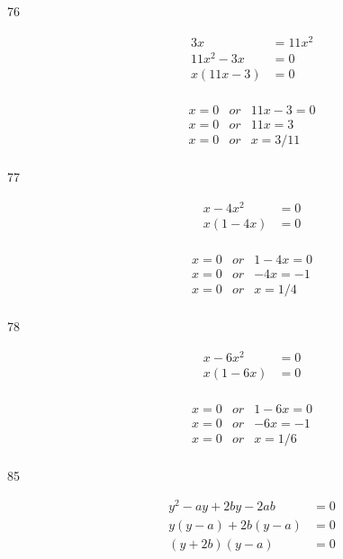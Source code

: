 \documentclass[letterpaper]{exam}
\begin{document}
\begin{description}
      \item[76]
      \begin{align*}
      3x &= 11x^2 \\
      11x^2 - 3x &= 0 \\
      x(11x - 3) &= 0 \\
      \end{align*}

      \begin{align*}
      x = 0 &or& 11x - 3 = 0 \\
      x = 0 &or& 11x = 3 \\
      x = 0 &or& x = 3/11 \\
      \end{align*}

      \item[77]
      \begin{align*}
        x - 4x^2 &= 0 \\
        x(1 - 4x) &= 0 \\
      \end{align*}

      \begin{align*}
        x = 0 &or& 1 - 4x = 0 \\
        x = 0 &or& -4x = -1 \\
        x = 0 &or& x = 1/4 \\
      \end{align*}

      \item[78]
      \begin{align*}
        x - 6x^2 &= 0 \\
        x(1 - 6x) &= 0 \\
      \end{align*}

      \begin{align*}
        x = 0 &or& 1 - 6x = 0 \\
        x = 0 &or&  -6x = -1 \\
        x = 0 &or&  x = 1/6 \\
      \end{align*}

      \item[85]
      \begin{align*}
        y^2 - ay + 2by - 2ab &= 0 \\
        y(y - a) + 2b(y - a) &= 0 \\
        (y + 2b)(y - a) &= 0 \\
      \end{align*}


\end{description}
\end{document}

